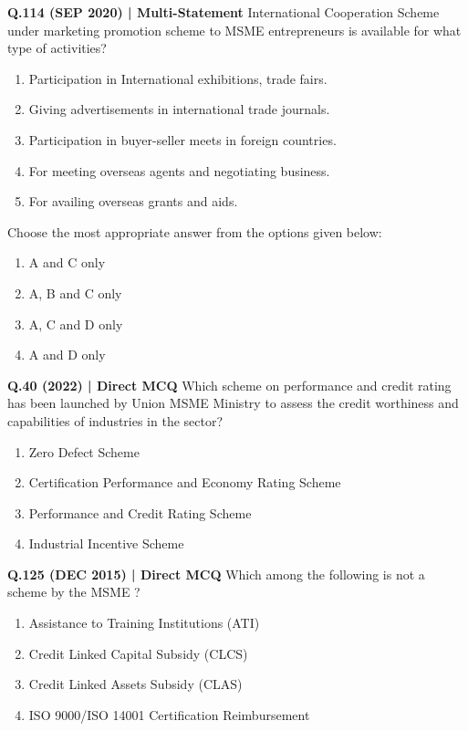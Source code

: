 \documentclass{article}
\begin{document}
\textbf{Q.114 (SEP 2020) | Multi-Statement}
International Cooperation Scheme under marketing promotion scheme to MSME entrepreneurs is available for what type of activities?
\begin{enumerate}[label=\Alph*.]
    \item Participation in International exhibitions, trade fairs.
    \item Giving advertisements in international trade journals.
    \item Participation in buyer-seller meets in foreign countries.
    \item For meeting overseas agents and negotiating business.
    \item For availing overseas grants and aids.
\end{enumerate}
Choose the most appropriate answer from the options given below:
\begin{enumerate}[label=(\arabic*)]
    \item A and C only
    \item A, B and C only
    \item A, C and D only
    \item A and D only
\end{enumerate}

\textbf{Q.40 (2022) | Direct MCQ}
Which scheme on performance and credit rating has been launched by Union MSME Ministry to assess the credit worthiness and capabilities of industries in the sector?
\begin{enumerate}[label=(\arabic*)]
    \item Zero Defect Scheme
    \item Certification Performance and Economy Rating Scheme
    \item Performance and Credit Rating Scheme
    \item Industrial Incentive Scheme
\end{enumerate}

\textbf{Q.125 (DEC 2015) | Direct MCQ}
Which among the following is not a scheme by the MSME ?
\begin{enumerate}[label=(\arabic*)]
    \item Assistance to Training Institutions (ATI)
    \item Credit Linked Capital Subsidy (CLCS)
    \item Credit Linked Assets Subsidy (CLAS)
    \item ISO 9000/ISO 14001 Certification Reimbursement
\end{enumerate}
\end{document}
